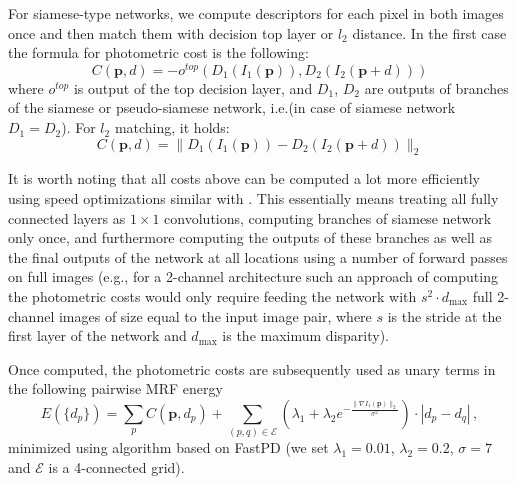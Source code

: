 \documentclass[10pt,twocolumn,letterpaper]{article}
\begin{document}
For siamese-type networks, %
we compute descriptors for each pixel
in both images once and then match them with decision top layer or $l_2$ distance. In the first case
the formula for photometric cost is the following:
\begin{equation}
  C(\mathbf{p},d) = - o^{top}(D_1(I_1(\mathbf{p})), D_2(I_2(\mathbf{p} + d)))
\end{equation}
where $o^{top}$ is output of the top decision layer, and $D_1$, $D_2$ are outputs of branches of the siamese
or pseudo-siamese network, i.e.\descriptors (in case of siamese network $D_1 = D_2$). For $l_2$ matching, it holds:
\begin{equation}
  C(\mathbf{p},d) = \|D_1(I_1(\mathbf{p})) - D_2(I_2(\mathbf{p} + d))\|_2
\end{equation}
%

%
%
%
%
%
%
%
%
%
%
%
%
%
It is worth noting that all costs above can be computed a lot more efficiently  using  speed optimizations similar with \cite{Zbontar}. This essentially means treating all fully connected layers as $1\times 1$ convolutions, computing branches of siamese network  only once, and furthermore computing the outputs of these branches as well as the final outputs of the network at all locations using a number of forward passes on full images (e.g.,  for a 2-channel architecture  such an approach of computing the photometric costs  would only require  feeding the network with $s^2\cdot d_{\mathrm{max}}$ full 2-channel images of size equal to the input image pair, where $s$ is the stride at the first layer of the network and $d_{\mathrm{max}}$ is the maximum disparity).

Once computed, the  photometric costs are  subsequently used as unary terms in the following pairwise MRF energy  
\[
E(\{d_p\}) \!=\! \sum_pC(\mathbf{p},d_p) +\!\!\! \sum_{(p,q)\in \mathcal{E}}\!\!\!(\lambda_1 + \lambda_2e^{-\frac{\|{\nabla}I_1(\mathbf{p})\|_2}{\sigma^2}}) \cdot|d_p-d_q|\,,
\]
minimized using algorithm \cite{NIPS2014_IbyL}  based on FastPD \cite{komodakis_cvpr2007} (we set $\lambda_1\!=\!0.01$, $\lambda_2\!=\!0.2$, $\sigma\!=\!7$ and $\mathcal{E}$ is a 4-connected grid).
\end{document}
